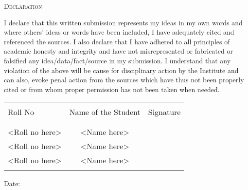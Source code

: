 \newpage

\begin{center}
    \Large \textsc {Declaration}\\[0.5cm]
\end{center}

I declare that this written submission represents my ideas in my own words and
where others' ideas or words have been included, I have adequately cited and
referenced the sources. I also declare that I have adhered to all principles
of academic honesty and integrity and have not misrepresented or fabricated or
falsified any idea/data/fact/source in my submission. I understand that any
violation of the above will be cause for disciplinary action by the Institute and can
also, evoke penal action from the sources which have thus not been properly cited
or from whom proper permission has not been taken when needed.\\[0.5cm]

\begin{table}[h]
    \centering
    \begin{tabular}{lcr}\hline                                      \\
        Roll No        & Name of the Student & Signature \\ \\ \hline
        \\
        <Roll no here> & <Name here>         &           \\
        <Roll no here> & <Name here>         &           \\
        <Roll no here> & <Name here>         &           \\ \\ \hline
    \end{tabular}
\end{table}

\vspace{1.5cm}

\begin{flushleft}
    Date:
\end{flushleft}
